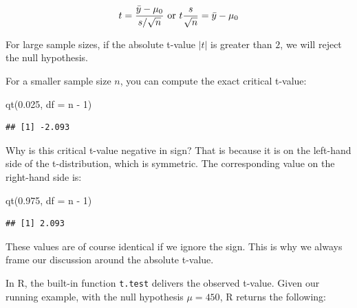 \documentclass[
  12pt,
]{krantz}
\newenvironment{Shaded}{\begin{snugshade}}{\end{snugshade}}
\newcommand{\AttributeTok}[1]{\textcolor[rgb]{0.77,0.63,0.00}{#1}}
\newcommand{\DecValTok}[1]{\textcolor[rgb]{0.00,0.00,0.81}{#1}}
\newcommand{\DocumentationTok}[1]{\textcolor[rgb]{0.56,0.35,0.01}{\textbf{\textit{#1}}}}
\newcommand{\FloatTok}[1]{\textcolor[rgb]{0.00,0.00,0.81}{#1}}
\newcommand{\FunctionTok}[1]{\textcolor[rgb]{0.00,0.00,0.00}{#1}}
\newcommand{\NormalTok}[1]{#1}
\newcommand{\SpecialCharTok}[1]{\textcolor[rgb]{0.00,0.00,0.00}{#1}}
\theoremstyle{definition}
\theoremstyle{definition}
\theoremstyle{definition}
\theoremstyle{definition}
\theoremstyle{remark}
\begin{document}
\begin{equation}
t=\frac{\bar{y}-\mu_0}{s/\sqrt{n}} \hbox{ or } t\frac{s}{\sqrt{n}}=\bar{y}-\mu_0
\end{equation}

For large sample sizes, if the absolute t-value \(|t|\) is greater than \(2\), we will reject the null hypothesis.

For a smaller sample size \(n\), you can compute the exact critical t-value:

\begin{Shaded}
\begin{Highlighting}[]
\FunctionTok{qt}\NormalTok{(}\FloatTok{0.025}\NormalTok{, }\AttributeTok{df =}\NormalTok{ n }\SpecialCharTok{{-}} \DecValTok{1}\NormalTok{)}
\end{Highlighting}
\end{Shaded}

\begin{verbatim}
## [1] -2.093
\end{verbatim}

Why is this critical t-value negative in sign? That is because it is on the left-hand side of the t-distribution, which is symmetric.
The corresponding value on the right-hand side is:

\begin{Shaded}
\begin{Highlighting}[]
\FunctionTok{qt}\NormalTok{(}\FloatTok{0.975}\NormalTok{, }\AttributeTok{df =}\NormalTok{ n }\SpecialCharTok{{-}} \DecValTok{1}\NormalTok{)}
\end{Highlighting}
\end{Shaded}

\begin{verbatim}
## [1] 2.093
\end{verbatim}

These values are of course identical if we ignore the sign. This is why we always frame our discussion around the absolute t-value.

In R, the built-in function \texttt{t.test} delivers the observed t-value. Given our running example, with the null hypothesis \(\mu=450\), R returns the following:

\begin{Shaded}
\end{Shaded}
\end{document}
